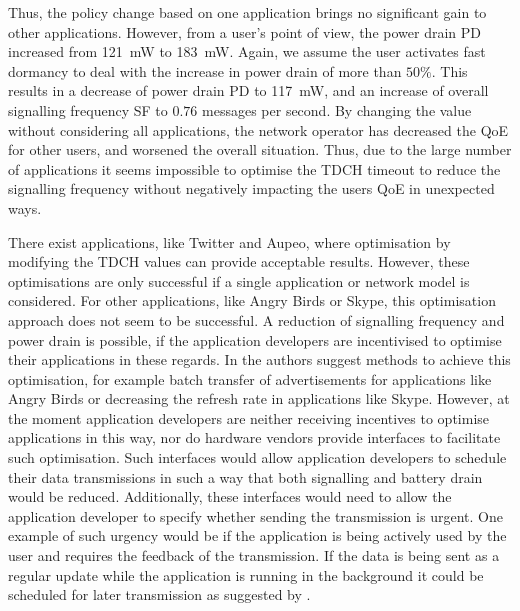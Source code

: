 Thus, the policy change based on one application brings no significant gain to other applications.
However, from a user's point of view, the power drain \gls{PD} increased from \SI{121}{\milli\watt} to \SI{183}{\milli\watt}.
Again, we assume the user activates fast dormancy to deal with the increase in power drain of more than $50\%$.
This results in a decrease of power drain \gls{PD} to \SI{117}{\milli\watt}, and an increase of overall signalling frequency \gls{SF} to \(0.76\) messages per second.
By changing the value without considering all applications, the network operator has decreased the \gls{QoE} for other users, and worsened the overall situation.
Thus, due to the large number of applications it seems impossible to optimise the \gls{TDCH} timeout to reduce the signalling frequency without negatively impacting the users \gls{QoE} in unexpected ways.

There exist applications, like Twitter and Aupeo, where optimisation by modifying the \gls{TDCH} values can provide acceptable results.
However, these optimisations are only successful if a single application or network model is considered.
For other applications, like Angry Birds or Skype, this optimisation approach does not seem to be successful.
A reduction of signalling frequency and power drain is possible, if the application developers are incentivised to optimise their applications in these regards.
In \cite{Qian2011a} the authors suggest methods to achieve this optimisation, for example batch transfer of advertisements for applications like Angry Birds or decreasing the refresh rate in applications like Skype.
However, at the moment application developers are neither receiving incentives to optimise applications in this way, nor do hardware vendors provide interfaces to facilitate such optimisation.
Such interfaces would allow application developers to schedule their data transmissions in such a way that both signalling and battery drain would be reduced.
Additionally, these interfaces would need to allow the application developer to specify whether sending the transmission is urgent.
One example of such urgency would be if the application is being actively used by the user and requires the feedback of the transmission.
If the data is being sent as a regular update while the application is running in the background it could be scheduled for later transmission as suggested by \cite{Calder2010, Vergara2012}.

